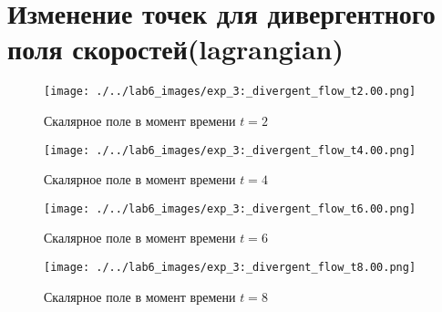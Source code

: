 \chapter{Изменение точек для дивергентного поля скоростей(lagrangian)}
\label{app:div_lg}

\begin{figure}[h]
	\centering
	\begin{minipage}[b]{0.48\textwidth}
		\centering
		\texttt{[image: ./../lab6\_images/exp\_3:\_divergent\_flow\_t2.00.png]}
		\caption{Скалярное поле в момент времени $t=2$}
	\end{minipage}
	\hfill
	\begin{minipage}[b]{0.48\textwidth}
		\centering
		\texttt{[image: ./../lab6\_images/exp\_3:\_divergent\_flow\_t4.00.png]}
		\caption{Скалярное поле в момент времени $t=4$}
	\end{minipage}
	\vspace{0.5cm}
	
	\begin{minipage}[b]{0.48\textwidth}
		\centering
		\texttt{[image: ./../lab6\_images/exp\_3:\_divergent\_flow\_t6.00.png]}
		\caption{Скалярное поле в момент времени $t=6$}
	\end{minipage}
	\hfill
	\begin{minipage}[b]{0.48\textwidth}
		\centering
		\texttt{[image: ./../lab6\_images/exp\_3:\_divergent\_flow\_t8.00.png]}
		\caption{Скалярное поле в момент времени $t=8$}
	\end{minipage}
\end{figure}
